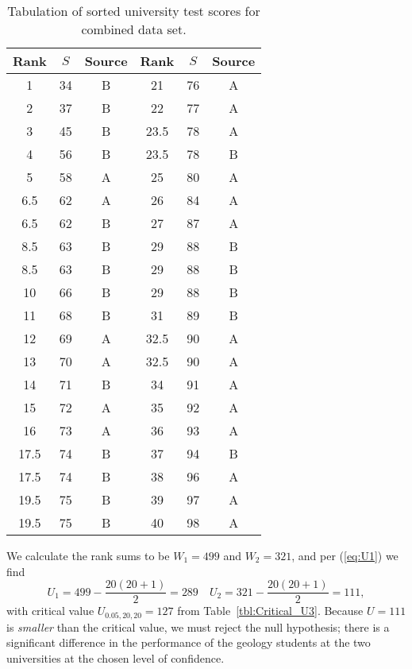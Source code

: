 \begin{table}[h]
\centering
\begin{tabular}{|c|c|c||c|c|c|} \hline
\bf{Rank} & $S$ & \bf{Source} & \bf{Rank} & $S$ & \bf{Source} \\ \hline \hline
 1    &  34  &   B    &    21    &  76  &   A \\ \hline
 2    &  37  &   B    &    22    &  77  &   A \\ \hline
 3    &  45  &   B    &    23.5  &  78  &   A \\ \hline
 4    &  56  &   B    &    23.5  &  78  &   B \\ \hline
 5    &  58  &   A    &    25    &  80  &   A \\ \hline
 6.5  &  62  &   A    &    26    &  84  &   A \\ \hline
 6.5  &  62  &   B    &    27    &  87  &   A \\ \hline
 8.5  &  63  &   B    &    29    &  88  &   B \\ \hline
 8.5  &  63  &   B    &    29    &  88  &   B \\ \hline
10    &  66  &   B    &    29    &  88  &   B \\ \hline
11    &  68  &   B    &    31    &  89  &   B \\ \hline
12    &  69  &   A    &    32.5  &  90  &   A \\ \hline
13    &  70  &   A    &    32.5  &  90  &   A \\ \hline
14    &  71  &   B    &    34    &  91  &   A \\ \hline
15    &  72  &   A    &    35    &  92  &   A \\ \hline
16    &  73  &   A    &    36    &  93  &   A \\ \hline
17.5  &  74  &   B    &    37    &  94  &   B \\ \hline
17.5  &  74  &   B    &    38    &  96  &   A \\ \hline
19.5  &  75  &   B    &    39    &  97  &   A \\ \hline
19.5  &  75  &   B    &    40    &  98  &   A \\ \hline
\end{tabular}
\caption{Tabulation of sorted university test scores for combined data set.}
\label{tbl:Unitest}
\end{table}
We calculate the rank sums to be $W_1 = 499$ and $W_2 = 321$, and per (\ref{eq:U1}) we find
\[
U_1 = 499 - \frac{20(20 + 1)}{2} = 289 \quad
U_2 = 321 - \frac{20(20 + 1)}{2} = 111,
\]
with critical value $U_{0.05,20,20} = 127$ from Table~\ref{tbl:Critical_U3}.  Because $U = 111$ is
\emph{smaller} than the critical value, we must reject the null hypothesis; there is a significant
difference in the performance of the geology students at the two universities at the chosen level of confidence.
\\

